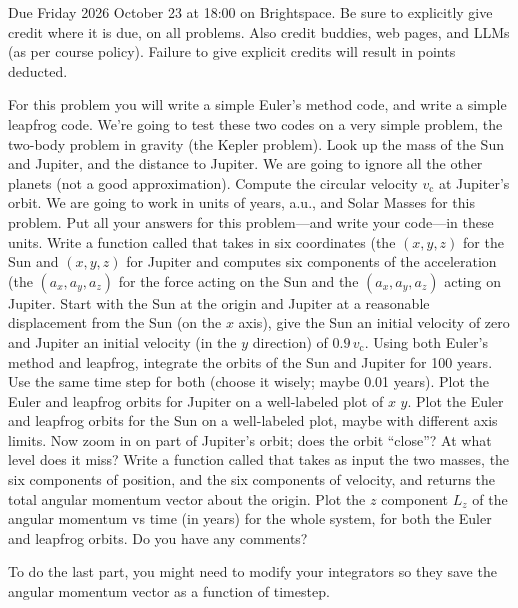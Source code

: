 \documentclass[12pt]{article}
\begin{document}
Due Friday 2026 October 23 at 18:00 on Brightspace.
Be sure to explicitly give credit where it is due, on all problems.
Also credit buddies, web pages, and LLMs (as per course policy).
Failure to give explicit credits will result in points deducted.

\begin{problem}
  For this problem you will write a simple Euler's method code, and write a simple leapfrog code.
  We're going to test these two codes on a very simple problem, the two-body problem in gravity
  (the Kepler problem).
  \subpart Look up the mass of the Sun and Jupiter, and the distance to Jupiter.
  We are going to ignore all the other planets (not a good approximation).
  Compute the circular velocity $v_\mathrm{c}$ at Jupiter's orbit.
  We are going to work in units of years, a.u., and Solar Masses for this problem.
  Put all your answers for this problem---and write your code---in these units.
  \subpart
  Write a function called  that takes in six coordinates (the $(x,y,z)$ for the Sun and $(x,y,z)$ for Jupiter and computes six components of the acceleration (the $(a_x, a_y, a_z)$ for the force acting on the Sun and the $(a_x, a_y, a_z)$ acting on Jupiter.
  \subpart
  Start with the Sun at the origin and Jupiter at a reasonable displacement from the Sun (on the $x$ axis), give the Sun an initial velocity of zero and Jupiter an initial velocity (in the $y$ direction) of $0.9\,v_\mathrm{c}$.
  Using both Euler's method and leapfrog, integrate the orbits of the Sun and Jupiter for 100 years.
  Use the same time step for both (choose it wisely; maybe 0.01 years).
  Plot the Euler and leapfrog orbits for Jupiter on a well-labeled plot of $x$  $y$.
  Plot the Euler and leapfrog orbits for the Sun on a well-labeled plot, maybe with different axis limits.
  Now zoom in on part of Jupiter's orbit; does the orbit ``close''? At what level does it miss?
  \subpart
  Write a function called  that takes as input the two masses, the six components of position, and the six components of velocity, and returns the total angular momentum vector about the origin.
  Plot the $z$ component $L_z$ of the angular momentum vs time (in years) for the whole system, for both the Euler and leapfrog orbits.
  Do you have any comments?
\end{problem}

\begin{note}
  To do the last part, you might need to modify your integrators so they save the angular momentum vector as a function of timestep.
\end{note}
\end{document}
